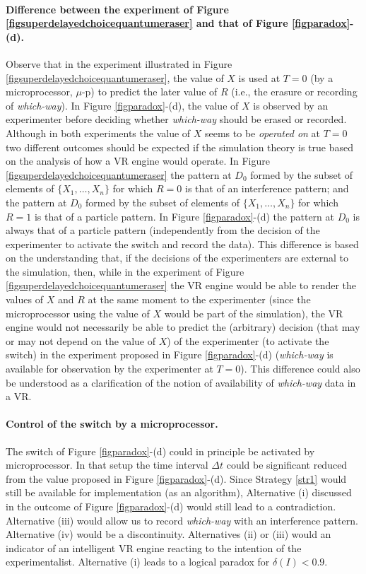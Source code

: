 \documentclass[11pt]{article}
\theoremstyle{definition}
\begin{document}
\paragraph{Difference between the experiment of Figure \ref{figsuperdelayedchoicequantumeraser} and that of Figure \ref{figparadox}-(d).}
Observe that in the experiment illustrated in
Figure \ref{figsuperdelayedchoicequantumeraser}, the value of $X$ is used at $T=0$ (by a microprocessor, $\mu$-p) to predict the later value of $R$ (i.e., the erasure or recording of \emph{which-way}). In Figure \ref{figparadox}-(d), the value of $X$ is observed by an experimenter before deciding whether \emph{which-way} should be erased or recorded. Although in both experiments the value of $X$ seems to be \emph{operated on} at $T=0$  two different outcomes should be expected if the simulation theory is true based on  the analysis of how a VR engine would operate. In
Figure \ref{figsuperdelayedchoicequantumeraser} the pattern at $D_0$ formed by the subset of elements of $\{X_1,\ldots,X_n\}$ for which $R=0$ is that of an interference pattern; and the pattern at $D_0$ formed by the subset of elements of $\{X_1,\ldots,X_n\}$ for which $R=1$ is that of a particle pattern. In Figure \ref{figparadox}-(d) the pattern at $D_0$ is always that of a particle pattern (independently from the decision of the experimenter to activate the switch and record the data). This difference is based on the understanding that, if the decisions of the experimenters are external to the simulation, then, while in the experiment of Figure \ref{figsuperdelayedchoicequantumeraser} the VR engine would be able to render the values of $X$ and $R$ at the same moment to the experimenter (since the microprocessor using the value of $X$ would be part of the simulation), the VR engine would not necessarily be able to predict the (arbitrary) decision (that may or may not depend on the value of $X$) of the experimenter (to activate the switch) in the experiment proposed in Figure \ref{figparadox}-(d) (\emph{which-way} is available for observation by the experimenter at $T=0$). This difference could also be understood as a clarification of the notion of availability of \emph{which-way} data in a VR.

\paragraph{Control of the switch by a microprocessor.} The switch of Figure \ref{figparadox}-(d) could in principle be activated by microprocessor. In that setup the time interval $\Delta t$ could be significant reduced from the value proposed in  Figure \ref{figparadox}-(d). Since Strategy \ref{str1} would still be available for implementation (as an algorithm), Alternative (i) discussed in the outcome of Figure \ref{figparadox}-(d) would still lead to a contradiction. Alternative (iii) would allow us to record \emph{which-way} with an interference pattern. Alternative (iv) would be a discontinuity.
Alternatives (ii) or (iii) would an indicator of an intelligent VR engine reacting
to the intention of the experimentalist. Alternative (i) leads to a logical paradox for $\delta(I)<0.9$.
\end{document}
